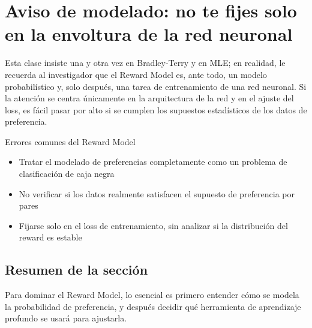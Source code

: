 \section{Aviso de modelado: no te fijes solo en la envoltura de la red neuronal}
Esta clase insiste una y otra vez en Bradley-Terry y en MLE; en realidad, le recuerda al investigador que el Reward Model es, ante todo, un modelo probabilístico y, solo después, una tarea de entrenamiento de una red neuronal. Si la atención se centra únicamente en la arquitectura de la red y en el ajuste del loss, es fácil pasar por alto si se cumplen los supuestos estadísticos de los datos de preferencia.

\begin{warningbox}{Errores comunes del Reward Model}
\begin{itemize}
  \item Tratar el modelado de preferencias completamente como un problema de clasificación de caja negra
  \item No verificar si los datos realmente satisfacen el supuesto de preferencia por pares
  \item Fijarse solo en el loss de entrenamiento, sin analizar si la distribución del reward es estable
\end{itemize}
\end{warningbox}

\subsection{Resumen de la sección}
Para dominar el Reward Model, lo esencial es primero entender cómo se modela la probabilidad de preferencia, y después decidir qué herramienta de aprendizaje profundo se usará para ajustarla.

\newpage
